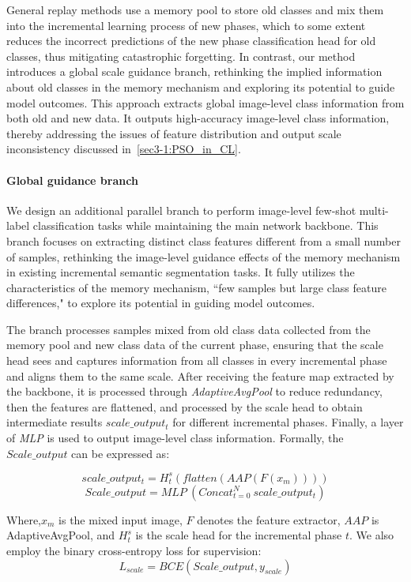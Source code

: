 General replay methods use a memory pool to store old classes and mix them into the incremental learning process of new phases, which to some extent reduces the incorrect predictions of the new phase classification head for old classes, thus mitigating catastrophic forgetting. In contrast, our method introduces a global scale guidance branch, rethinking the implied information about old classes in the memory mechanism and exploring its potential to guide model outcomes. This approach extracts global image-level class information from both old and new data. It outputs high-accuracy image-level class information, thereby addressing the issues of feature distribution and output scale inconsistency discussed in~\cref{sec3-1:PSO_in_CL}.

\paragraph{Global guidance branch}
We design an additional parallel branch to perform image-level few-shot multi-label classification tasks while maintaining the main network backbone. This branch focuses on extracting distinct class features different from a small number of samples, rethinking the image-level guidance effects of the memory mechanism in existing incremental semantic segmentation tasks. It fully utilizes the characteristics of the memory mechanism, ``few samples but large class feature differences," to explore its potential in guiding model outcomes.


The branch processes samples mixed from old class data collected from the memory pool and new class data of the current phase, ensuring that the scale head sees and captures information from all classes in every incremental phase and aligns them to the same scale.
After receiving the feature map extracted by the backbone, it is processed through \textit{AdaptiveAvgPool} to reduce redundancy, then the features are flattened, and processed by the scale head to obtain intermediate results \(scale\_output_{t}\) for different incremental phases. Finally, a layer of \textit{MLP} is used to output image-level class information. Formally, the \(Scale\_output\) can be expressed as:

\[scale\_output_t=H_t^s(flatten(AAP(F(x_m))))\]
\[Scale\_output=MLP~(Concat_{t=0}^N~scale\_output_t)\]

Where,\(x_m\) is the mixed input image, \(F\) denotes the feature extractor, \(AAP\) is AdaptiveAvgPool, and \(H_t^s\) is the scale head for the incremental phase \(t\). We also employ the binary cross-entropy loss for supervision:
\[L_{scale}=BCE(Scale\_output,y_{scale})\]

